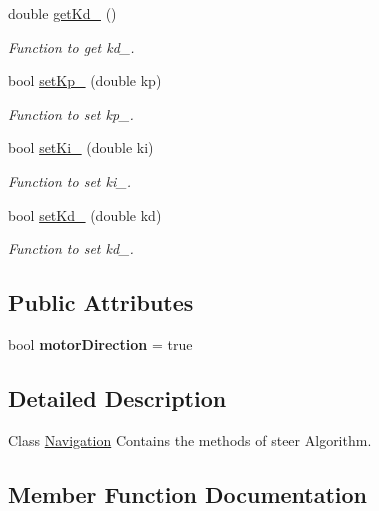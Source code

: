 \begin{DoxyCompactItemize}
double \hyperlink{class_navigation_ac6441bb601483166ef7a8081b76f634d}{get\+Kd\+\_\+} ()
\begin{DoxyCompactList}\small\item\em Function to get kd\+\_\+. \end{DoxyCompactList}\item 
bool \hyperlink{class_navigation_a6dd95f46ff4ecc69895452a1879c30af}{set\+Kp\+\_\+} (double kp)
\begin{DoxyCompactList}\small\item\em Function to set kp\+\_\+. \end{DoxyCompactList}\item 
bool \hyperlink{class_navigation_a539d10206ceb162171e39c36e8aa8f0f}{set\+Ki\+\_\+} (double ki)
\begin{DoxyCompactList}\small\item\em Function to set ki\+\_\+. \end{DoxyCompactList}\item 
bool \hyperlink{class_navigation_a4986e4357d9707ddf92cf8f559ef3dce}{set\+Kd\+\_\+} (double kd)
\begin{DoxyCompactList}\small\item\em Function to set kd\+\_\+. \end{DoxyCompactList}\end{DoxyCompactItemize}
\subsection*{Public Attributes}
\begin{DoxyCompactItemize}
\item 
bool {\bfseries motor\+Direction} = true\hypertarget{class_navigation_ad7d7a5d5d1abe99e6b0f31ddb4794252}{}\label{class_navigation_ad7d7a5d5d1abe99e6b0f31ddb4794252}

\end{DoxyCompactItemize}


\subsection{Detailed Description}
Class \hyperlink{class_navigation}{Navigation} Contains the methods of steer Algorithm. 

\subsection{Member Function Documentation}
